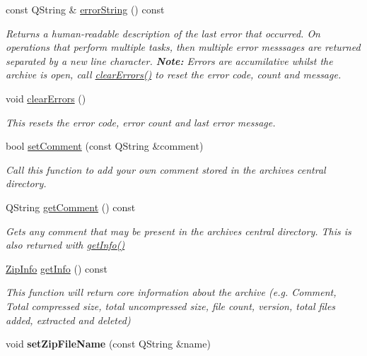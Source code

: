 \begin{DoxyCompactItemize}
const Q\+String \& \hyperlink{class_ab_zip_a218ae44456c9e7518ad22fb9f8fd7466}{error\+String} () const 
\begin{DoxyCompactList}\small\item\em Returns a human-\/readable description of the last error that occurred. On operations that perform multiple tasks, then multiple error messsages are returned separated by a new line character. {\bfseries Note\+:} Errors are accumilative whilst the archive is open, call \hyperlink{class_ab_zip_a4e08361f95e0bc46aae1599232674230}{clear\+Errors()} to reset the error code, count and message. \end{DoxyCompactList}\item 
void \hyperlink{class_ab_zip_a4e08361f95e0bc46aae1599232674230}{clear\+Errors} ()\hypertarget{class_ab_zip_a4e08361f95e0bc46aae1599232674230}{}\label{class_ab_zip_a4e08361f95e0bc46aae1599232674230}

\begin{DoxyCompactList}\small\item\em This resets the error code, error count and last error message. \end{DoxyCompactList}\item 
bool \hyperlink{class_ab_zip_a6eafaf85de8379cbbf0e0936ff35f82b}{set\+Comment} (const Q\+String \&comment)
\begin{DoxyCompactList}\small\item\em Call this function to add your own comment stored in the archives central directory. \end{DoxyCompactList}\item 
Q\+String \hyperlink{class_ab_zip_a03bf0363847fa7d2b37ca9217d497b73}{get\+Comment} () const 
\begin{DoxyCompactList}\small\item\em Gets any comment that may be present in the archives central directory. This is also returned with \hyperlink{class_ab_zip_a1516ad117dad8e91491a6a5367539f70}{get\+Info()} \end{DoxyCompactList}\item 
\hyperlink{class_zip_info}{Zip\+Info} \hyperlink{class_ab_zip_a1516ad117dad8e91491a6a5367539f70}{get\+Info} () const 
\begin{DoxyCompactList}\small\item\em This function will return core information about the archive (e.\+g. Comment, Total compressed size, total uncompressed size, file count, version, total files added, extracted and deleted) \end{DoxyCompactList}\item 
void {\bfseries set\+Zip\+File\+Name} (const Q\+String \&name)\hypertarget{class_ab_zip_a769a83363d37087880fb9b60a1f32fc4}{}\label{class_ab_zip_a769a83363d37087880fb9b60a1f32fc4}

\end{DoxyCompactItemize}


